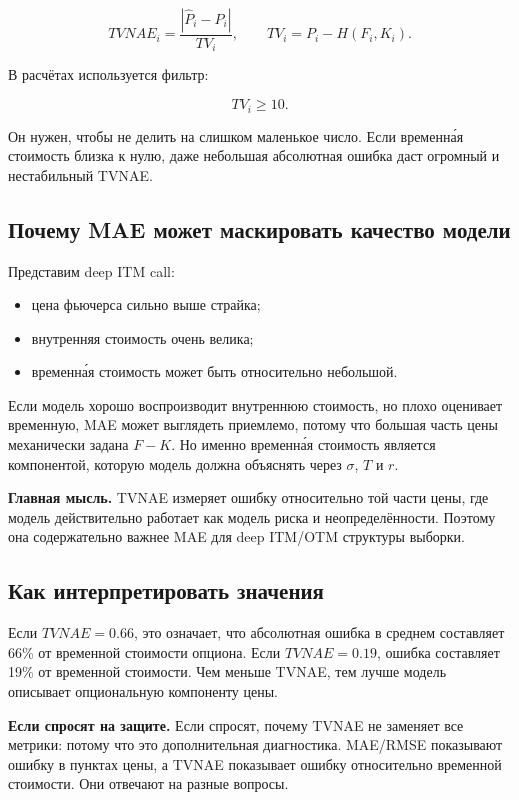 \documentclass[11pt,a4paper]{article}
\newcommand{\key}[1]{%
  \vspace{0.15em}
  \noindent\colorbox{softblue}{%
    \parbox{\dimexpr\linewidth-2\fboxsep\relax}{\textbf{Главная мысль.} #1}%
  }\vspace{0.2em}
}
\newcommand{\answer}[1]{%
  \vspace{0.15em}
  \noindent\colorbox{softgreen}{%
    \parbox{\dimexpr\linewidth-2\fboxsep\relax}{\textbf{Если спросят на защите.} #1}%
  }\vspace{0.2em}
}
\begin{document}
\begin{equation}
TVNAE_i =
\frac{|\widehat{P}_i-P_i|}{TV_i},
\qquad
TV_i=P_i-H(F_i,K_i).
\end{equation}

В расчётах используется фильтр:

\begin{equation}
TV_i \geq 10.
\end{equation}

Он нужен, чтобы не делить на слишком маленькое число. Если временна́я стоимость близка к нулю, даже небольшая абсолютная ошибка даст огромный и нестабильный TVNAE.

\subsection{Почему MAE может маскировать качество модели}

Представим deep ITM call:

\begin{itemize}
    \item цена фьючерса сильно выше страйка;
    \item внутренняя стоимость очень велика;
    \item временна́я стоимость может быть относительно небольшой.
\end{itemize}

Если модель хорошо воспроизводит внутреннюю стоимость, но плохо оценивает временную, MAE может выглядеть приемлемо, потому что большая часть цены механически задана $F-K$. Но именно временна́я стоимость является компонентой, которую модель должна объяснять через $\sigma$, $T$ и $r$.

\key{TVNAE измеряет ошибку относительно той части цены, где модель действительно работает как модель риска и неопределённости. Поэтому она содержательно важнее MAE для deep ITM/OTM структуры выборки.}

\subsection{Как интерпретировать значения}

Если $TVNAE=0.66$, это означает, что абсолютная ошибка в среднем составляет 66\% от временной стоимости опциона. Если $TVNAE=0.19$, ошибка составляет 19\% от временной стоимости. Чем меньше TVNAE, тем лучше модель описывает опциональную компоненту цены.

\answer{Если спросят, почему TVNAE не заменяет все метрики: потому что это дополнительная диагностика. MAE/RMSE показывают ошибку в пунктах цены, а TVNAE показывает ошибку относительно временной стоимости. Они отвечают на разные вопросы.}
\end{document}
